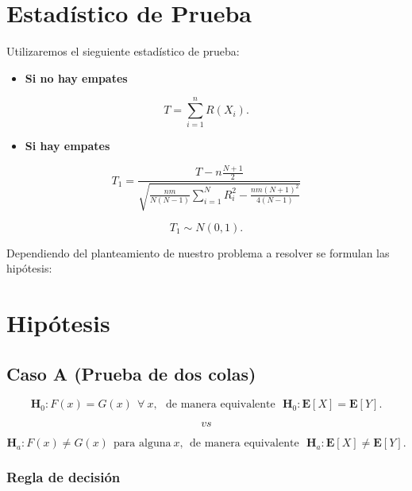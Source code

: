 \documentclass[
  a4paper,
  oneside,
  openany]{book}
\providecommand{\tightlist}{%
  \setlength{\itemsep}{0pt}\setlength{\parskip}{0pt}}
\begin{document}
\hypertarget{estaduxedstico-de-prueba-5}{%
\section{Estadístico de Prueba}\label{estaduxedstico-de-prueba-5}}

Utilizaremos el sieguiente estadístico de prueba:

\begin{itemize}
\tightlist
\item
  \textbf{Si no hay empates}
\end{itemize}

\[T=\sum_{i=1}^{n}R(X_{i}).\]

\begin{itemize}
\tightlist
\item
  \textbf{Si hay empates}
\end{itemize}

\[T_1= \frac{T-n\frac{N+1}{2}}{\sqrt{\frac{nm}{N(N-1)}\sum_{i=1}^{N}R_i^2-\frac{nm(N+1)^2}{4(N-1)}}}\]

\[T_{1}\sim N(0,1).\]

Dependiendo del planteamiento de nuestro problema a resolver se formulan las hipótesis:

\hypertarget{hipuxf3tesis-5}{%
\section{Hipótesis}\label{hipuxf3tesis-5}}

\hypertarget{caso-a-prueba-de-dos-colas-5}{%
\subsection*{Caso A (Prueba de dos colas)}\label{caso-a-prueba-de-dos-colas-5}}


\[\textbf{H}_0: F(x) = G(x) \ \  \forall\ x, \ \ \  \mbox{de manera equivalente} \ \ \  \textbf{H}_0:\mathbf{E}[X] = \mathbf{E}[Y].\]

\[vs\]

\[\textbf{H}_a: F(x) \neq G(x) \ \ \mbox{para alguna} \ x,  \ \ \mbox{de manera equivalente} \ \ \  \textbf{H}_a:
\mathbf{E}[X] \neq \mathbf{E}[Y].\]

\hypertarget{regla-de-decisiuxf3n-13}{%
\subsubsection*{Regla de decisión}\label{regla-de-decisiuxf3n-13}}
\end{document}
